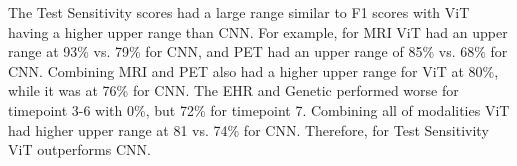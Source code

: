 The Test Sensitivity scores had a large range similar to F1 scores with ViT having a higher upper range than CNN. For example, for MRI ViT had an upper range at 93\% vs. 79\% for CNN, and PET had an upper range of 85\% vs. 68\% for CNN. Combining MRI and PET also had a higher upper range for ViT at 80\%, while it was at 76\% for CNN. The EHR and Genetic performed worse for timepoint 3-6 with 0\%, but 72\% for timepoint 7. Combining all of modalities ViT had higher upper range at 81 vs. 74\% for CNN. Therefore, for Test Sensitivity ViT outperforms CNN.